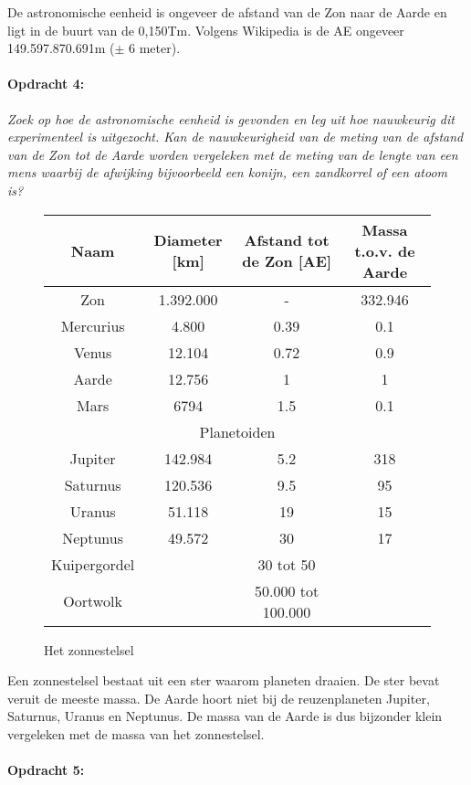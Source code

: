 De astronomische eenheid is ongeveer de afstand van de Zon naar de
Aarde en ligt in de buurt van de 0,150Tm. Volgens Wikipedia is de
AE ongeveer 149.597.870.691m ($\pm$ 6 meter).


\paragraph*{Opdracht 4:}

\emph{Zoek op hoe de astronomische eenheid is gevonden en leg uit
hoe nauwkeurig dit experimenteel is uitgezocht. Kan de nauwkeurigheid
van de meting van de afstand van de Zon tot de Aarde worden vergeleken
met de meting van de lengte van een mens waarbij de afwijking bijvoorbeeld
een konijn, een zandkorrel of een atoom is?}

\begin{figure}[h]
\noindent \begin{centering}
\begin{tabular}{|c|c|c|c|}
\hline 
Naam & Diameter {[}km{]} & Afstand tot de Zon {[}AE{]} & Massa t.o.v. de Aarde\tabularnewline
\hline 
\hline 
Zon & 1.392.000 & - & 332.946\tabularnewline
\hline 
Mercurius & 4.800 & 0.39 & 0.1\tabularnewline
\hline 
Venus & 12.104 & 0.72 & 0.9\tabularnewline
\hline 
Aarde & 12.756 & 1 & 1\tabularnewline
\hline 
Mars & 6794 & 1.5 & 0.1\tabularnewline
\hline 
\multicolumn{4}{|c|}{Planetoiden}\tabularnewline
\hline 
Jupiter & 142.984 & 5.2 & 318\tabularnewline
\hline 
Saturnus & 120.536 & 9.5 & 95\tabularnewline
\hline 
Uranus & 51.118 & 19 & 15\tabularnewline
\hline 
Neptunus & 49.572 & 30 & 17\tabularnewline
\hline 
Kuipergordel &  & 30 tot 50 & \tabularnewline
\hline 
Oortwolk &  & 50.000 tot 100.000 & \tabularnewline
\hline 
\end{tabular}
\par\end{centering}

\caption{Het zonnestelsel}
\end{figure}


Een zonnestelsel bestaat uit een ster waarom planeten draaien. De
ster bevat veruit de meeste massa. De Aarde hoort niet bij de reuzenplaneten
Jupiter, Saturnus, Uranus en Neptunus. De massa van de Aarde is dus
bijzonder klein vergeleken met de massa van het zonnestelsel.


\paragraph*{Opdracht 5:}

